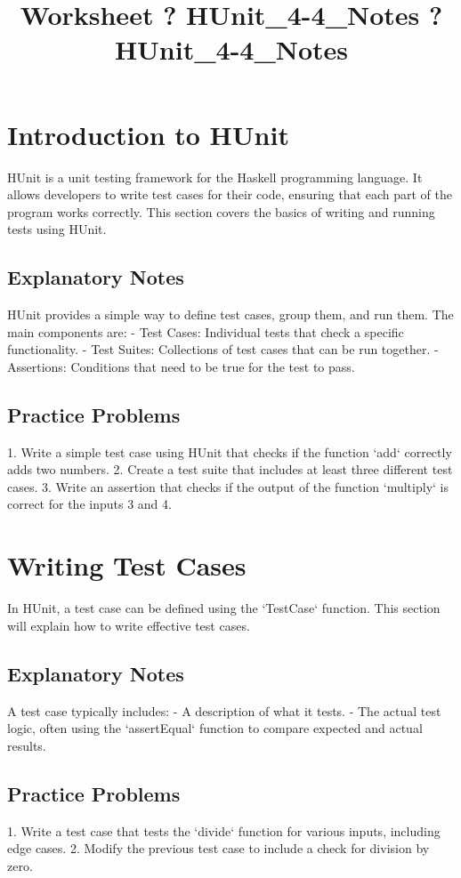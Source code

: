 \documentclass{article}
\title{Worksheet ? HUnit_4-4_Notes ? HUnit_4-4_Notes}
\author{}
\date{}
\begin{document}
\maketitle

\section*{Introduction to HUnit}
HUnit is a unit testing framework for the Haskell programming language. It allows developers to write test cases for their code, ensuring that each part of the program works correctly. This section covers the basics of writing and running tests using HUnit.

\subsection*{Explanatory Notes}
HUnit provides a simple way to define test cases, group them, and run them. The main components are:
- Test Cases: Individual tests that check a specific functionality.
- Test Suites: Collections of test cases that can be run together.
- Assertions: Conditions that need to be true for the test to pass.

\subsection*{Practice Problems}
1. Write a simple test case using HUnit that checks if the function `add` correctly adds two numbers.
2. Create a test suite that includes at least three different test cases.
3. Write an assertion that checks if the output of the function `multiply` is correct for the inputs 3 and 4.

\section*{Writing Test Cases}
In HUnit, a test case can be defined using the `TestCase` function. This section will explain how to write effective test cases.

\subsection*{Explanatory Notes}
A test case typically includes:
- A description of what it tests.
- The actual test logic, often using the `assertEqual` function to compare expected and actual results.

\subsection*{Practice Problems}
1. Write a test case that tests the `divide` function for various inputs, including edge cases.
2. Modify the previous test case to include a check for division by zero.
\end{document}
